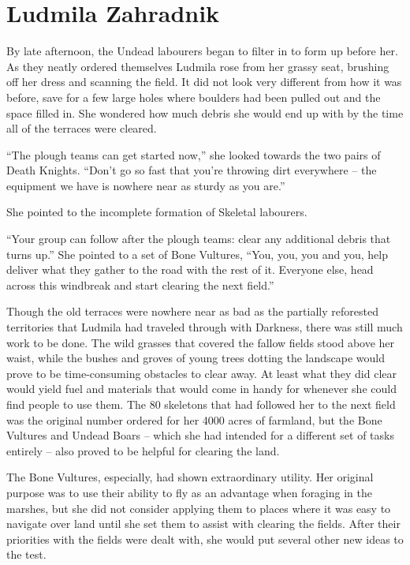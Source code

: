 \chapter{Ludmila Zahradnik}

By late afternoon, the Undead labourers began to filter in to form up before her. As they neatly ordered themselves Ludmila rose from her grassy seat, brushing off her dress and scanning the field. It did not look very different from how it was before, save for a few large holes where boulders had been pulled out and the space filled in. She wondered how much debris she would end up with by the time all of the terraces were cleared.

 

“The plough teams can get started now,” she looked towards the two pairs of Death Knights. “Don’t go so fast that you’re throwing dirt everywhere – the equipment we have is nowhere near as sturdy as you are.”

 

She pointed to the incomplete formation of Skeletal labourers.

 

“Your group can follow after the plough teams: clear any additional debris that turns up.” She pointed to a set of Bone Vultures, “You, you, you and you, help deliver what they gather to the road with the rest of it. Everyone else, head across this windbreak and start clearing the next field.”

 

Though the old terraces were nowhere near as bad as the partially reforested territories that Ludmila had traveled through with Darkness, there was still much work to be done. The wild grasses that covered the fallow fields stood above her waist, while the bushes and groves of young trees dotting the landscape would prove to be time-consuming obstacles to clear away. At least what they did clear would yield fuel and materials that would come in handy for whenever she could find people to use them. The 80 skeletons that had followed her to the next field was the original number ordered for her 4000 acres of farmland, but the Bone Vultures and Undead Boars – which she had intended for a different set of tasks entirely – also proved to be helpful for clearing the land.

 

The Bone Vultures, especially, had shown extraordinary utility. Her original purpose was to use their ability to fly as an advantage when foraging in the marshes, but she did not consider applying them to places where it was easy to navigate over land until she set them to assist with clearing the fields. After their priorities with the fields were dealt with, she would put several other new ideas to the test.

